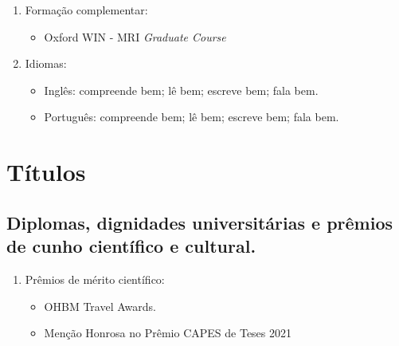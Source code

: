 \documentclass[a4paper,oneside,10pt]{article}
\newcounter{document}%
\begin{document}
{\begin{enumerate}
        \item Formação complementar:
        \begin{itemize}
                \item Oxford WIN - MRI \textit{Graduate Course} \mbox{} \\
        \end{itemize}

        \item Idiomas:
        \begin{itemize}
                \item Inglês: compreende bem; lê bem; escreve bem; fala bem.
                \item Português: compreende bem; lê bem; escreve bem; fala bem.
        \end{itemize}
\end{enumerate}}

\newpage
\section{Títulos}
\subsection{Diplomas, dignidades universitárias e prêmios de cunho científico e cultural.}
\large{
\begin{enumerate}
        \item Prêmios de mérito científico:
        \begin{itemize}
                \item OHBM Travel Awards. \mbox{} \\
                \item Menção Honrosa no Prêmio CAPES de Teses 2021 \mbox{} \\
        \end{itemize}
\end{enumerate}}


\end{document}
